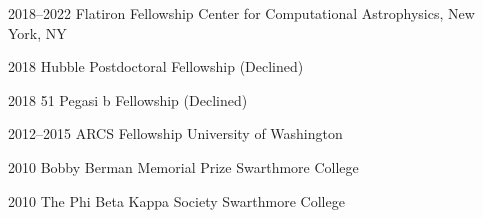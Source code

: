\documentclass[]{luger-cv} %
\begin{document}
\begin{entrylist}

    \entry
    {2018--2022}
    {Flatiron Fellowship}
    {Center for Computational Astrophysics, New York, NY}
    {%
        \vspace*{-1.1em}
    }

    \entry
    {2018}
    {Hubble Postdoctoral Fellowship}
    {(Declined)}
    {%
        \vspace*{-1.1em}
    }


    \entry
    {2018}
    {51 Pegasi b Fellowship}
    {(Declined)}
    {%
        \vspace*{-1.1em}
    }


    \entry
    {2012--2015}
    {ARCS Fellowship}
    {University of Washington}
    {%
        \vspace*{-1.1em}
    }


    \entry
    {2010}
    {Bobby Berman Memorial Prize}
    {Swarthmore College}
    {%
        \vspace*{-1.1em}
    }


    \ifdefined \onepage \else
        \entry
        {2010}
        {The Phi Beta Kappa Society}
        {Swarthmore College}
        {}
    \fi


\end{entrylist}


\end{document}
